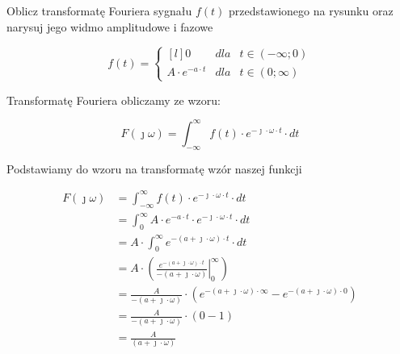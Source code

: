 \begin{task}
Oblicz transformatę Fouriera sygnału $f(t)$ przedstawionego na rysunku oraz narysuj jego widmo amplitudowe i fazowe

\begin{figure}[H]
\centering
{}
\end{figure}

\begin{equation}
f(t) = \left\{\begin{matrix*}[l]
0 & dla & t \in \left(-\infty; 0\right)\\
A \cdot e^{-a\cdot t} & dla & t \in \left(0; \infty\right)
\end{matrix*}\right.
\end{equation}

Transformatę Fouriera obliczamy ze wzoru:

\begin{equation}
F(\jmath \omega )=\int_{-\infty }^{\infty}f(t) \cdot e^{-\jmath \cdot \omega \cdot t}\cdot dt
\end{equation}

Podstawiamy do wzoru na transformatę wzór naszej funkcji

\begin{equation}
\begin{aligned}
F(\jmath \omega )&=\int_{-\infty }^{\infty}f(t) \cdot e^{-\jmath \cdot \omega \cdot t}\cdot dt\\
&=\int_{0}^{\infty} A \cdot e^{-a \cdot t} \cdot e^{-\jmath \cdot \omega \cdot t}\cdot dt\\
&=A\cdot \int_{0}^{\infty} e^{-( a + \jmath \cdot \omega) \cdot t}\cdot dt\\
&=A\cdot \left(\left. \frac{e^{-( a + \jmath \cdot \omega) \cdot t}}{-( a + \jmath \cdot \omega)}\right |_{0}^{\infty} \right )\\
&=\frac{A}{-( a + \jmath \cdot \omega)} \cdot \left(e^{-( a + \jmath \cdot \omega) \cdot \infty} - e^{-( a + \jmath \cdot \omega) \cdot 0}\right)\\
&=\frac{A}{-( a + \jmath \cdot \omega)} \cdot \left(0 - 1\right)\\
&=\frac{A}{( a + \jmath \cdot \omega)}
\end{aligned}
\end{equation}


\end{task}
